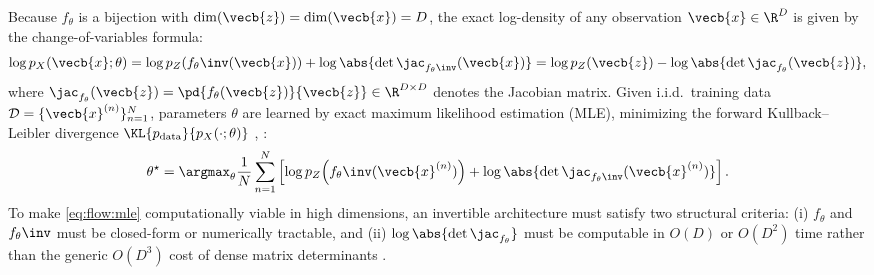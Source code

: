 \documentclass[../../../../master.tex]{subfiles}
\begin{document}
Because $f_\theta$ is a bijection with $\dim(\vecb{z}) = \dim(\vecb{x}) = D$, the exact log-density of any observation $\vecb{x} \in \R^D$ is given by the change-of-variables formula:
\begin{equation}\label{eq:flow:cov_basic}
  \log p_X(\vecb{x}; \theta) = \log p_Z\!\left(f_\theta\inv(\vecb{x})\right) + \log \abs{\det \jac_{f_\theta\inv}(\vecb{x})} = \log p_Z(\vecb{z}) - \log \abs{\det \jac_{f_\theta}(\vecb{z})},
\end{equation}
where $\jac_{f_\theta}(\vecb{z}) = \pd{f_\theta(\vecb{z})}{\vecb{z}} \in \R^{D \times D}$ denotes the Jacobian matrix. Given i.i.d.\ training data $\mathcal{D} = \{\vecb{x}^{(n)}\}_{n=1}^N$, parameters $\theta$ are learned by exact maximum likelihood estimation (MLE), minimizing the forward Kullback--Leibler divergence $\KL{p_{\mathrm{data}}}{p_X(\cdot; \theta)}$ , :
\begin{equation}\label{eq:flow:mle}
  \theta^\star = \argmax_\theta \frac{1}{N}\sum_{n=1}^N \left[ \log p_Z\!\left(f_\theta\inv(\vecb{x}^{(n)})\right) + \log \abs{\det \jac_{f_\theta\inv}(\vecb{x}^{(n)})} \right].
\end{equation}
To make \eqref{eq:flow:mle} computationally viable in high dimensions, an invertible architecture must satisfy two structural criteria: (i) $f_\theta$ and $f_\theta\inv$ must be closed-form or numerically tractable, and (ii) $\log \abs{\det \jac_{f_\theta}}$ must be computable in $O(D)$ or $O(D^2)$ time rather than the generic $O(D^3)$ cost of dense matrix determinants .
\end{document}
